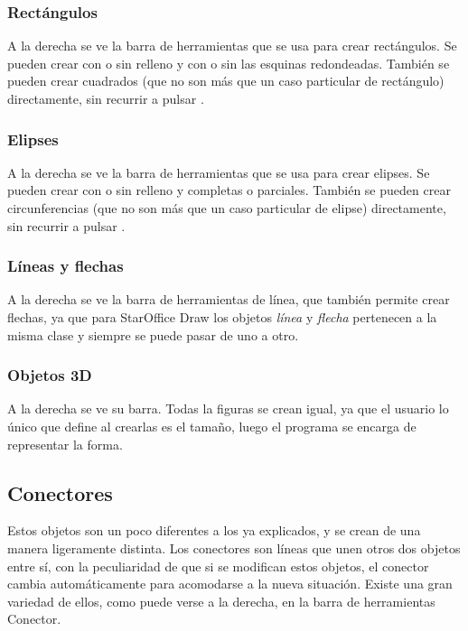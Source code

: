 \subsubsection{Rectángulos}

A la derecha se ve la barra de herramientas que se usa para crear
rectángulos. Se pueden crear con o sin relleno y con o sin las
esquinas redondeadas. También se pueden crear cuadrados (que no son
más que un caso particular de rectángulo) directamente, sin recurrir a
pulsar .

\subsubsection{Elipses}

A la derecha se ve la barra de herramientas que se usa para crear
elipses. Se pueden crear con o sin relleno y completas o
parciales. También se pueden crear circunferencias (que no son más que
un caso particular de elipse) directamente, sin recurrir a pulsar
.

\subsubsection{Líneas y flechas}

A la derecha se ve la barra de herramientas de línea, que también
permite crear flechas, ya que para StarOffice Draw los objetos
\emph{línea} y \emph{flecha} pertenecen a la misma clase y siempre se
puede pasar de uno a otro.

\subsubsection{Objetos 3D}

A la derecha se ve su barra. Todas la figuras se crean igual, ya que
el usuario lo único que define al crearlas es el tamaño, luego el
programa se encarga de representar la forma.

\subsection{Conectores}

Estos objetos son un poco diferentes a los ya explicados, y se crean
de una manera ligeramente distinta. Los conectores son líneas que unen
otros dos objetos entre sí, con la peculiaridad de que si se modifican
estos objetos, el conector cambia automáticamente para acomodarse a la
nueva situación. Existe una gran variedad de ellos, como puede verse a
la derecha, en la barra de herramientas Conector.

